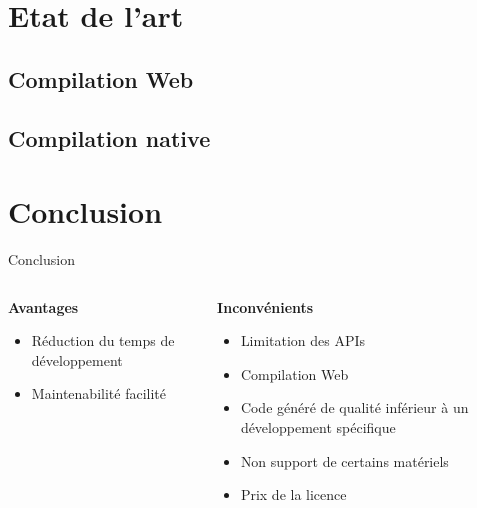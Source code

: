 \documentclass{beamer}
\begin{document}
\section{Etat de l'art}

\subsection{Compilation Web}
\begin{frame}
\end{frame}

\subsection{Compilation native}
\begin{frame}
\end{frame}

\section{Conclusion}
\begin{frame}{Conclusion}
\begin{columns}[c]
  \begin{column}{0.5\textwidth}
    \textbf{Avantages}
    \begin{itemize}
      \item Réduction du temps de développement
      \item Maintenabilité facilité
    \end{itemize}
  \end{column}
  \begin{column}{0.5\textwidth}
    \textbf{Inconvénients}
    \begin{itemize}
      \item Limitation des APIs
      \item Compilation Web
      \item Code généré de qualité inférieur à un développement spécifique
      \item Non support de certains matériels
      \item Prix de la licence
    \end{itemize}
  \end{column}
\end{columns}
\end{frame}
\end{document}

